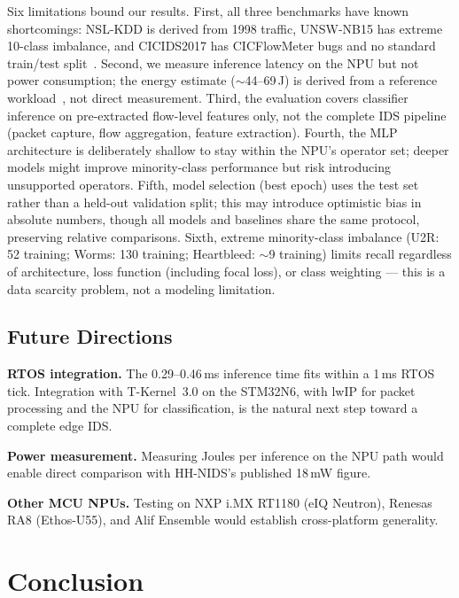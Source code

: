 \documentclass[10pt,twocolumn]{article}
\begin{document}
Six limitations bound our results.
First, all three benchmarks have known shortcomings: NSL-KDD is derived
from 1998 traffic, UNSW-NB15 has extreme 10-class imbalance, and
CICIDS2017 has CICFlowMeter bugs and no standard train/test
split~\cite{sharafaldin2018cicids}.
Second, we measure inference latency on the NPU but not power consumption;
the energy estimate (${\sim}$44--69\,\textmu J) is derived from a
reference workload~\cite{st_an5946}, not direct measurement.
Third, the evaluation covers classifier inference on pre-extracted
flow-level features only, not the complete IDS pipeline (packet capture,
flow aggregation, feature extraction).
Fourth, the MLP architecture is deliberately shallow to stay within
the NPU's operator set; deeper models might improve minority-class
performance but risk introducing unsupported operators.
Fifth, model selection (best epoch) uses the test set rather than a
held-out validation split; this may introduce optimistic bias in
absolute numbers, though all models and baselines share the same
protocol, preserving relative comparisons.
Sixth, extreme minority-class imbalance (U2R: 52 training;
Worms: 130 training; Heartbleed: ${\sim}$9 training) limits recall regardless of architecture,
loss function (including focal loss), or class weighting ---
this is a data scarcity problem, not a modeling limitation.

\subsection{Future Directions}

\textbf{RTOS integration.}
The 0.29--0.46\,ms inference time fits within a 1\,ms RTOS tick.
Integration with \textmu T-Kernel~3.0 on the STM32N6, with lwIP for
packet processing and the NPU for classification, is the natural next
step toward a complete edge IDS.

\textbf{Power measurement.}
Measuring Joules per inference on the NPU path would enable direct
comparison with HH-NIDS's published 18\,mW figure.

\textbf{Other MCU NPUs.}
Testing on NXP i.MX RT1180 (eIQ Neutron), Renesas RA8 (Ethos-U55),
and Alif Ensemble would establish cross-platform generality.

\section{Conclusion}
\label{sec:conclusion}
\end{document}
